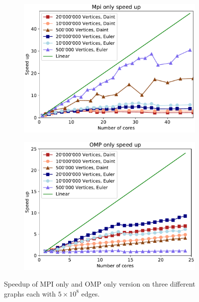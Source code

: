 \begin{figure}[H]
\begin{subfigure}[c]{0.5\textwidth}
\includegraphics[width=\textwidth]{data/mpi_speedup_with_ref}
\label{fig:speedup_mpi}
\end{subfigure}
\begin{subfigure}[c]{0.5\textwidth}
\includegraphics[width=\textwidth]{data/omp_speedup_with_ref}
\label{fig:speedup_omp}
\end{subfigure}
\caption{Speedup of MPI only and OMP only version on three different graphs each with
$5\times10^{8}$ edges.}
\label{fig:speedup}
\end{figure}

